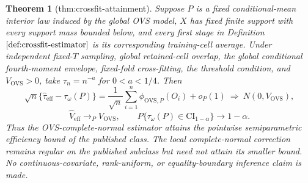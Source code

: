 \documentclass{article}
\newtheorem{theorem}{Theorem}
\begin{document}
\begin{theorem}[thm:crossfit-attainment]\label{thm:crossfit-attainment}
Suppose \(P\) is a fixed conditional-mean interior law induced by the global OVS model, \(X\) has fixed finite support with every support mass bounded below, and every first stage in Definition \(\ref{def:crossfit-estimator}\) is its corresponding training-cell average.  Under independent fixed-\(T\) sampling, global retained-cell overlap, the global conditional fourth-moment envelope, fixed-fold cross-fitting, the threshold condition, and \(V_{\mathrm{OVS}}>0\), take \(\tau_n=n^{-a}\) for \(0<a<1/4\).  Then
\[
\sqrt n\{\widehat\tau_{\mathrm{eff}}-\tau_\omega(P)\}
=\frac1{\sqrt n}\sum_{i=1}^n\phi_{\mathrm{OVS},P}(O_i)+o_P(1)
\ \Rightarrow\ N(0,V_{\mathrm{OVS}}),
\tag{41}
\]
\[
\widehat V_{\mathrm{eff}}\longrightarrow_P V_{\mathrm{OVS}},
\qquad
P\{\tau_\omega(P)\in\mathrm{CI}_{1-\alpha}\}\longrightarrow1-\alpha.
\tag{42}
\]
Thus the OVS-complete-normal estimator attains the pointwise semiparametric efficiency bound of the published class.  The local complete-normal correction remains regular on the published subclass but need not attain its smaller bound.  No continuous-covariate, rank-uniform, or equality-boundary inference claim is made.
\end{theorem}
\end{document}
